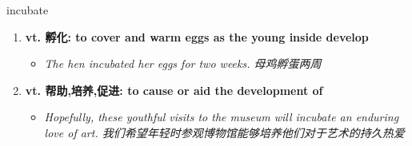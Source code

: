
\begin{frame}
{\huge incubate}
\begin{center}
\begin{enumerate}\Large
  \item \textbf{vt. 孵化: to cover and warm eggs as the young inside develop}
  \begin{itemize}
    \item \em{\Large{The hen incubated her eggs for two weeks. 母鸡孵蛋两周}}
  \end{itemize}
  \item \textbf{vt. 帮助,培养,促进: to cause or aid the development of}
  \begin{itemize}
    \item \em{\Large{Hopefully, these youthful visits to the museum will incubate an enduring love of art. 我们希望年轻时参观博物馆能够培养他们对于艺术的持久热爱}}
  \end{itemize}
\end{enumerate}
\end{center}
\end{frame}
